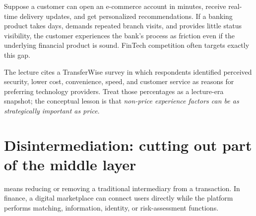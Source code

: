 \begin{workedexample}
Suppose a customer can open an e-commerce account in minutes, receive real-time delivery updates, and get personalized recommendations. If a banking product takes days, demands repeated branch visits, and provides little status visibility, the customer experiences the bank's process as friction even if the underlying financial product is sound. FinTech competition often targets exactly this gap.
\end{workedexample}

The lecture cites a TransferWise survey in which respondents identified perceived security, lower cost, convenience, speed, and customer service as reasons for preferring technology providers. Treat those percentages as a lecture-era snapshot; the conceptual lesson is that \emph{non-price experience factors can be as strategically important as price}.

\section{Disintermediation: cutting out part of the middle layer}

 means reducing or removing a traditional intermediary from a transaction. In finance, a digital marketplace can connect users directly while the platform performs matching, information, identity, or risk-assessment functions.

\begin{mlfigure}
\end{mlfigure}

